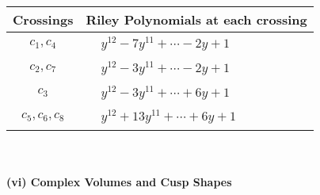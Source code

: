 \documentclass[1p]{elsarticle_modified}
\theoremstyle{definition}
\begin{document}
\begin{tabular}{m{50pt}|m{274pt}}
Crossings & \hspace{64pt}Riley Polynomials at each crossing \\
\hline $$\begin{aligned}c_{1},c_{4}\end{aligned}$$&$\begin{aligned}
&y^{12}-7 y^{11}+\cdots-2 y+1
\end{aligned}$\\
\hline $$\begin{aligned}c_{2},c_{7}\end{aligned}$$&$\begin{aligned}
&y^{12}-3 y^{11}+\cdots-2 y+1
\end{aligned}$\\
\hline $$\begin{aligned}c_{3}\end{aligned}$$&$\begin{aligned}
&y^{12}-3 y^{11}+\cdots+6 y+1
\end{aligned}$\\
\hline $$\begin{aligned}c_{5},c_{6},c_{8}\end{aligned}$$&$\begin{aligned}
&y^{12}+13 y^{11}+\cdots+6 y+1
\end{aligned}$\\
\hline
\end{tabular}\\~\\
\newpage\flushleft \textbf{(vi) Complex Volumes and Cusp Shapes}
\end{document}
